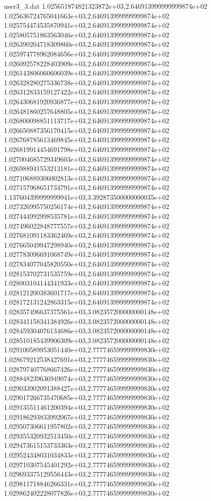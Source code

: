 \begin{filecontents}{user3_3.dat}
1.025651874821323872e+03,2.646913999999999874e+02
1.025636724765041663e+03,2.646913999999999874e+02
1.025754474535870941e+03,2.646913999999999874e+02
1.025805751863563046e+03,2.646913999999999874e+02
1.026390204718309860e+03,2.646913999999999874e+02
1.025974778962084656e+03,2.646913999999999874e+02
1.026092578228403909e+03,2.646913999999999874e+02
1.026143806060606039e+03,2.646913999999999874e+02
1.026328280275336738e+03,2.646913999999999874e+02
1.026312833159127422e+03,2.646913999999999874e+02
1.026430681920936877e+03,2.646913999999999874e+02
1.026481860257648805e+03,2.646913999999999874e+02
1.026800098851113717e+03,2.646913999999999874e+02
1.026650887356170415e+03,2.646913999999999874e+02
1.026768785613469845e+03,2.646913999999999874e+02
1.026819914454691798e+03,2.646913999999999874e+02
1.027004685729349603e+03,2.646913999999999874e+02
1.026988941553213181e+03,2.646913999999999874e+02
1.027106889306002813e+03,2.646913999999999874e+02
1.027157968651734791e+03,2.646913999999999874e+02
1.137604399999999941e+03,3.392873500000000035e+02
1.027326995750256174e+03,2.646913999999999874e+02
1.027444992998535781e+03,2.646913999999999874e+02
1.027496022848777557e+03,2.646913999999999874e+02
1.027681091183362469e+03,2.646913999999999874e+02
1.027665049947298940e+03,2.646913999999999874e+02
1.027783096691068749e+03,2.646913999999999874e+02
1.027834077045820550e+03,2.646913999999999874e+02
1.028153702731535759e+03,2.646913999999999874e+02
1.028003104144341933e+03,2.646913999999999874e+02
1.028121200383601717e+03,2.646913999999999874e+02
1.028172131242863315e+03,2.646913999999999874e+02
1.028357496637375561e+03,3.082357200000000148e+02
1.028341158341384926e+03,3.082357200000000148e+02
1.028459304076134686e+03,3.082357200000000148e+02
1.028510185439906309e+03,3.082357200000000148e+02
1.029100589953051440e+03,2.777746599999999830e+02
1.028679212538427691e+03,2.777746599999999830e+02
1.028797407768667426e+03,2.777746599999999830e+02
1.028848239636949074e+03,2.777746599999999830e+02
1.029033902091388427e+03,2.777746599999999830e+02
1.029017266735470685e+03,2.777746599999999830e+02
1.029135511461200394e+03,2.777746599999999830e+02
1.029186293833992067e+03,2.777746599999999830e+02
1.029507306611957802e+03,2.777746599999999830e+02
1.029355320932513450e+03,2.777746599999999830e+02
1.029473615153733363e+03,2.777746599999999830e+02
1.029524348031034833e+03,2.777746599999999830e+02
1.029710307545401292e+03,2.777746599999999830e+02
1.029693375129556443e+03,2.777746599999999830e+02
1.029811718846266331e+03,2.777746599999999830e+02
1.029862402228077826e+03,2.777746599999999830e+02

\end{filecontents}
